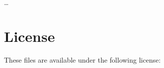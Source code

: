 \dots

\section{License}

These files are available under the following license:
\begin{quote}
  
\end{quote}
